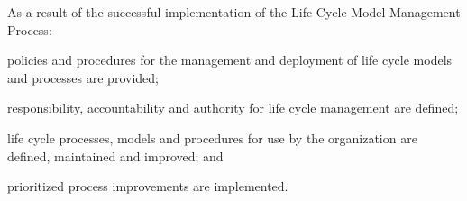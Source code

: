 			\begin{adjustwidth}{2em}{0pt} 

				As a result of the successful implementation of the Life Cycle Model Management Process:

				\begin{compactitem}

					\item policies and procedures for the management and deployment of life cycle models and processes are provided;
					
					\item responsibility, accountability and authority for life cycle management are defined;
					
					\item life cycle processes, models and procedures for use by the organization are defined, maintained and improved; and
					
					\item prioritized process improvements are implemented.
				
				\end{compactitem}

			\end{adjustwidth}

